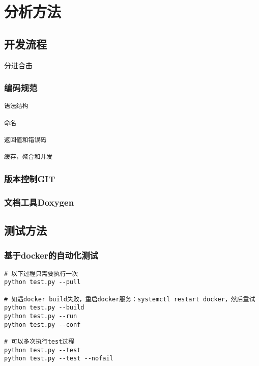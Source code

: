 \chapter{分析方法}

\section{开发流程}

分进合击

\subsection{编码规范}

\begin{lstlisting}
语法结构

命名

返回值和错误码

缓存，聚合和并发
\end{lstlisting}

\subsection{版本控制GIT}

\subsection{文档工具Doxygen}


\section{测试方法}

\subsection{基于docker的自动化测试}

\begin{lstlisting}
# 以下过程只需要执行一次
python test.py --pull

# 如遇docker build失败，重启docker服务：systemctl restart docker，然后重试
python test.py --build
python test.py --run
python test.py --conf

# 可以多次执行test过程
python test.py --test
python test.py --test --nofail
\end{lstlisting}

